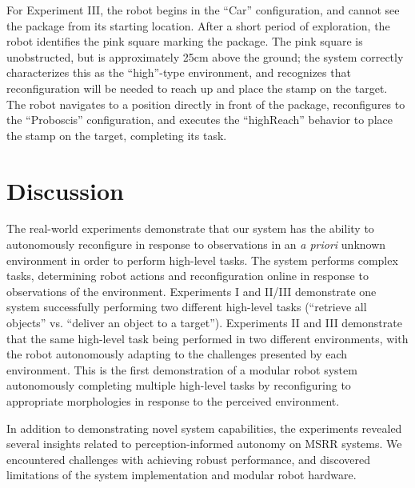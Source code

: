 \documentclass[12pt]{article}
\begin{document}
For Experiment III, the robot begins in the ``Car'' configuration, and cannot see the package from its starting location.  After a short period of exploration, the robot identifies the pink square marking the package.  The pink square is unobstructed, but is approximately 25cm above the ground; the system correctly characterizes this as the ``high''-type environment, and recognizes that reconfiguration will be needed to reach up and place the stamp on the target.  The robot navigates to a position directly in front of the package, reconfigures to the ``Proboscis'' configuration, and executes the ``highReach'' behavior to place the stamp on the target, completing its task.
%
\section{Discussion}
\label{sec:discussion}
The real-world experiments demonstrate that our system has the ability to autonomously reconfigure in response to observations in an \textit{a priori} unknown environment in order to perform high-level tasks. The system performs complex tasks, determining robot actions and reconfiguration online in response to observations of the environment. Experiments I and II/III demonstrate one system successfully performing two different high-level tasks (``retrieve all objects'' vs. ``deliver an object to a target''). Experiments II and III demonstrate that the same high-level task being performed in two different environments, with the robot autonomously adapting to the challenges presented by each environment. This is the first demonstration of a modular robot system autonomously completing multiple high-level tasks by reconfiguring to appropriate morphologies in response to the perceived environment.

In addition to demonstrating novel system capabilities, the experiments revealed several insights related to perception-informed autonomy on MSRR systems. We encountered challenges with achieving robust performance, and discovered limitations of the system implementation and modular robot hardware. %
%
\end{document}

